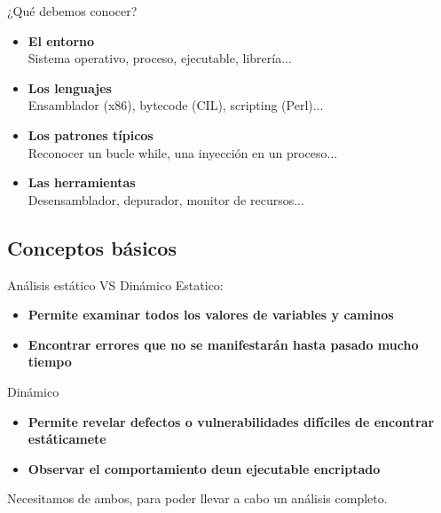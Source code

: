 \documentclass{beamer}
\begin{document}
\begin{frame}{¿Qué debemos conocer?}
\begin{itemize}
\item \textbf{El entorno} \\ \hspace{4ex}Sistema operativo, proceso, ejecutable, librería...
\item \textbf{Los lenguajes} \\ \hspace{4ex}Ensamblador (x86), bytecode (CIL), scripting (Perl)...
\item \textbf{Los patrones típicos} \\ \hspace{4ex}Reconocer un bucle while, una inyección en un proceso...
\item \textbf{Las herramientas} \\ \hspace{4ex}Desensamblador, depurador, monitor de recursos...
\end{itemize}

\end{frame}



\subsection{Conceptos básicos}

\begin{frame}{Análisis estático VS Dinámico}
Estatico:
\begin{itemize}
	\item \textbf{Permite examinar todos los valores de variables y caminos}
	\item \textbf{Encontrar errores que no se manifestarán hasta pasado mucho tiempo}
\end{itemize}
Dinámico
\begin{itemize}
	\item \textbf{Permite revelar defectos o vulnerabilidades difíciles de encontrar estáticamete}
	\item \textbf{Observar el comportamiento deun ejecutable encriptado}
\end{itemize}
Necesitamos de ambos, para poder llevar a cabo un análisis completo.


\end{frame}
\end{document}
